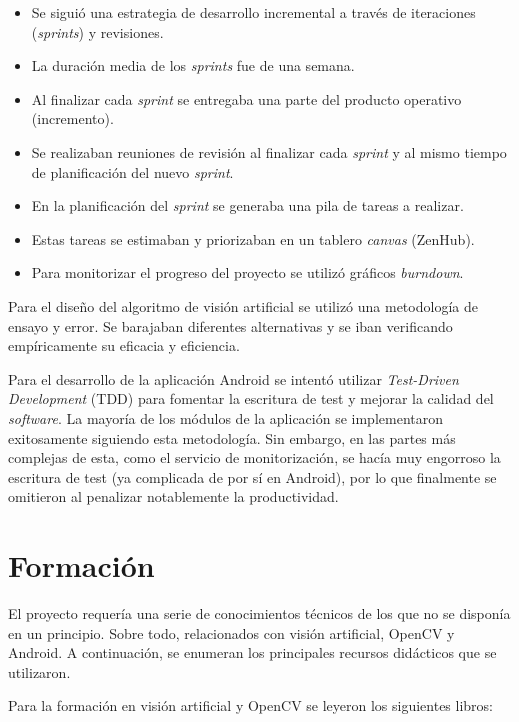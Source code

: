 \begin{itemize}
\tightlist
\item
  Se siguió una estrategia de desarrollo incremental a través de
  iteraciones (\emph{sprints}) y revisiones.
\item
  La duración media de los \emph{sprints} fue de una semana.
\item
  Al finalizar cada \emph{sprint} se entregaba una parte del producto
  operativo (incremento).
\item
  Se realizaban reuniones de revisión al finalizar cada \emph{sprint} y
  al mismo tiempo de planificación del nuevo \emph{sprint}.
\item
  En la planificación del \emph{sprint} se generaba una pila de tareas a
  realizar.
\item
  Estas tareas se estimaban y priorizaban en un tablero \emph{canvas}
  (ZenHub).
\item
  Para monitorizar el progreso del proyecto se utilizó gráficos
  \emph{burndown}.
\end{itemize}

Para el diseño del algoritmo de visión artificial se utilizó una
metodología de ensayo y error. Se barajaban diferentes alternativas y se
iban verificando empíricamente su eficacia y eficiencia.

Para el desarrollo de la aplicación Android se intentó utilizar
\emph{Test-Driven Development} (TDD) para fomentar la escritura de test
y mejorar la calidad del \emph{software}. La mayoría de los módulos de
la aplicación se implementaron exitosamente siguiendo esta metodología.
Sin embargo, en las partes más complejas de esta, como el servicio de
monitorización, se hacía muy engorroso la escritura de test (ya
complicada de por sí en Android), por lo que finalmente se omitieron al
penalizar notablemente la productividad.

\section{Formación}\label{formacion}

El proyecto requería una serie de conocimientos técnicos de los que no
se disponía en un principio. Sobre todo, relacionados con visión
artificial, OpenCV y Android. A continuación, se enumeran los
principales recursos didácticos que se utilizaron.

Para la formación en visión artificial y OpenCV se leyeron los
siguientes libros:

